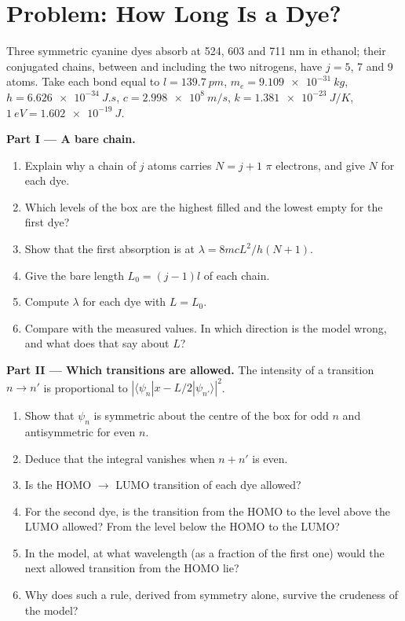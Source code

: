 \section{Problem: How Long Is a Dye?}

\begin{problem}
\label{pb:b3:quantum-model-systems:1}
Three symmetric cyanine dyes absorb at 524, 603 and 711 nm in ethanol; their
conjugated chains, between and including the two nitrogens, have $j = 5$, 7
and 9 atoms. Take each bond equal to $l = \qty{139.7}{pm}$, $m_e =
\qty{9.109e-31}{kg}$, $h = \qty{6.626e-34}{J.s}$, $c = \qty{2.998e8}{m/s}$,
$k = \qty{1.381e-23}{J/K}$, $\qty{1}{eV} = \qty{1.602e-19}{J}$.

\medskip\noindent\textbf{Part I --- A bare chain.}
\begin{enumerate}
  \item Explain why a chain of $j$ atoms carries $N = j + 1$ $\pi$ electrons, and
        give $N$ for each dye.
  \item Which levels of the box are the highest filled and the lowest empty
        for the first dye?
  \item Show that the first absorption is at $\lambda = 8mcL^2/h(N+1)$.
  \item Give the bare length $L_0 = (j - 1)l$ of each chain.
  \item Compute $\lambda$ for each dye with $L = L_0$.
  \item Compare with the measured values. In which direction is the model
        wrong, and what does that say about $L$?
\end{enumerate}

\medskip\noindent\textbf{Part II --- Which transitions are allowed.}
The intensity of a transition $n \to n'$ is proportional to $|\langle
\psi_n|x - L/2|\psi_{n'}\rangle|^2$.
\begin{enumerate}[resume]
  \item Show that $\psi_n$ is symmetric about the centre of the box for odd
        $n$ and antisymmetric for even $n$.
  \item Deduce that the integral vanishes when $n + n'$ is even.
  \item Is the HOMO $\to$ LUMO transition of each dye allowed?
  \item For the second dye, is the transition from the HOMO to the level
        above the LUMO allowed? From the level below the HOMO to the LUMO?
  \item In the model, at what wavelength (as a fraction of the first one)
        would the next allowed transition from the HOMO lie?
  \item Why does such a rule, derived from symmetry alone, survive the
        crudeness of the model?
\end{enumerate}


\end{problem}
